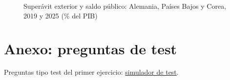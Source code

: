 \documentclass[11pt]{article}
\begin{document}
\begin{figure}[H]
\centering
\caption{Superávit exterior y saldo público: Alemania, Países Bajos y Corea, 2019 y 2025 (\% del PIB)}\label{fig:saldos-superavit}
\end{figure}

\section{Anexo: preguntas de test}\label{anexo:test}

\begin{anotaciones}
Preguntas tipo test del primer ejercicio: \href{https://www.victorgutierrezmarcos.es/oposicion/temario/primer-ejercicio/test/simulador.html?tema=3.B.19}{simulador de test}.
\end{anotaciones}

\bibliografia
\end{document}
